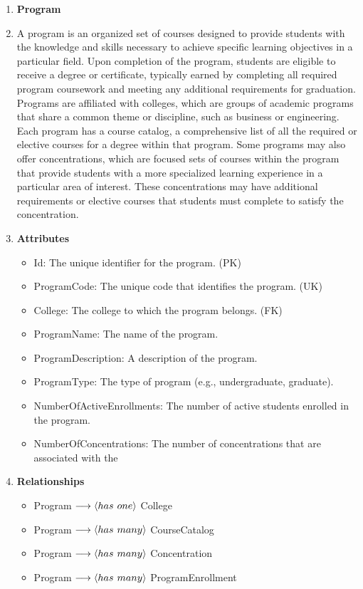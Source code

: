 \documentclass[12pt]{article}
\begin{document}
\begin{appendices}
\begin{enumerate}[label=(\roman*)]
    \item \textbf{Program}
    \item[] A program is an organized set of courses designed to provide students with the knowledge and skills necessary to achieve specific learning objectives in a particular field. Upon completion of the program, students are eligible to receive a degree or certificate, typically earned by completing all required program coursework and meeting any additional requirements for graduation. Programs are affiliated with colleges, which are groups of academic programs that share a common theme or discipline, such as business or engineering. Each program has a course catalog, a comprehensive list of all the required or elective courses for a degree within that program. Some programs may also offer concentrations, which are focused sets of courses within the program that provide students with a more specialized learning experience in a particular area of interest. These concentrations may have additional requirements or elective courses that students must complete to satisfy the concentration.
    \item[] \textbf{Attributes}
    \begin{itemize}
        \item Id: The unique identifier for the program. (PK)
        \item ProgramCode: The unique code that identifies the program. (UK)
        \item College: The college to which the program belongs. (FK)
        \item ProgramName: The name of the program.
        \item ProgramDescription: A description of the program.
        \item ProgramType: The type of program (e.g., undergraduate, graduate).
        \item NumberOfActiveEnrollments: The number of active students enrolled in the program.
        \item NumberOfConcentrations: The number of concentrations that are associated with the 
    \end{itemize}
    \item[] \textbf{Relationships}
    \begin{itemize}
        \item Program $ \longrightarrow \langle has \hspace{0.125cm} one \rangle $ College
        \item Program $ \longrightarrow \langle has \hspace{0.125cm} many \rangle $ CourseCatalog
        \item Program $ \longrightarrow \langle has \hspace{0.125cm} many \rangle $ Concentration
        \item Program $ \longrightarrow \langle has \hspace{0.125cm} many \rangle $ ProgramEnrollment
    \end{itemize}


\end{enumerate}
\end{appendices}
\end{document}

